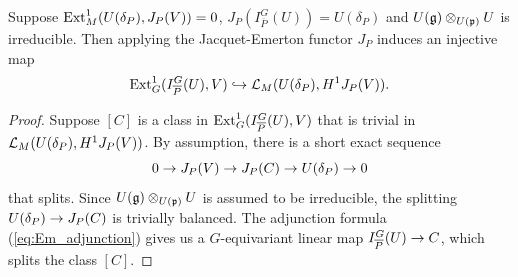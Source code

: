 \documentclass[10pt]{amsart}
\begin{document}
\begin{proposition}\label{prop:inj_beta}
Suppose $\textnormal{Ext}^{1}_{M}(U(\delta_{P}),J_{P}(V))=0$, $J_P(I_{\overline{P}}^{G}(U))=U(\delta_{P})$ and $U(\mathfrak{g})\otimes_{U(\mathfrak{p})} U$ is irreducible. Then applying the Jacquet-Emerton functor $J_P$ induces an injective map \[
    \textnormal{Ext}^{1}_{G}(I_{\overline{P}}^{G}(U),V) \hookrightarrow  \mathcal{L}_{M}(U(\delta_{P}),H^{1}J_{P}(V)).
\]
\end{proposition}
\begin{proof}
Suppose $[C]$ is a class in $\textnormal{Ext}^{1}_{G}(I_{\overline{P}}^{G}(U),V)$ that is trivial in $\mathcal{L}_{M}(U(\delta_{P}),H^{1}J_{P}(V))$. By assumption, there is a short exact sequence \[
    0 \rightarrow J_P(V) \rightarrow J_P(C) \rightarrow U(\delta_P) \rightarrow 0
\] that splits. Since $U(\mathfrak{g})\otimes_{U(\mathfrak{p})} U$ is assumed to be irreducible, the splitting $U(\delta_P)\rightarrow J_P(C)$ is trivially balanced. The adjunction formula (\ref{eq:Em_adjunction}) gives us a $G$-equivariant linear map $I_{\overline{P}}^{G}(U) \rightarrow C$, which splits the class $[C]$.
\end{proof}
\end{document}
